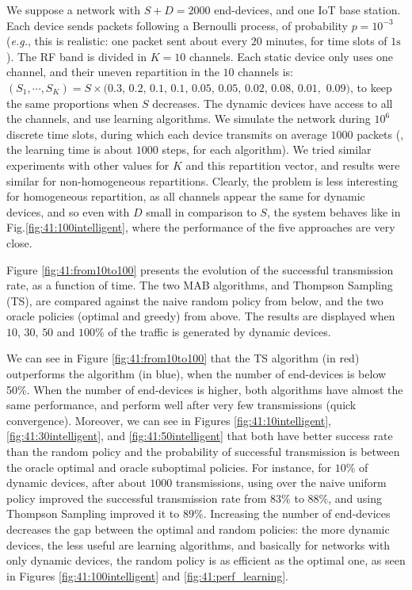 We suppose a network with $S + D = 2000$ end-devices, and one IoT base station.
Each device sends packets following a Bernoulli process, of probability $p = 10^{-3}$ (\emph{e.g.}, this is realistic: one packet sent about every $20$ minutes, for time slots of $1\mathrm{s}$).
The RF band is divided in $K = 10$ channels.
Each static device only uses one channel, and their uneven repartition in the $10$ channels is: $(S_1,\cdots, S_{K}) = S\times(0.3, \, 0.2, \, 0.1, \, 0.1, \, 0.05, \, 0.05, \, 0.02, \, 0.08, \, 0.01,$ $0.09)$, to keep the same proportions when $S$ decreases. The dynamic devices have access to all the channels, and use learning algorithms.
%
We simulate the network during $10^6$ discrete time slots, during which each device transmits on average $1000$ packets (\ie, the learning time is about $1000$ steps, for each algorithm).
We tried similar experiments with other values for $K$ and this repartition vector, and results were similar for non-homogeneous repartitions. Clearly, the problem is less interesting for homogeneous repartition, as all channels appear the same for dynamic devices, and so even with $D$ small in comparison to $S$, the system behaves like in Fig.\ref{fig:41:100intelligent}, where the performance of the five approaches are very close.

Figure \ref{fig:41:from10to100} presents the evolution of the successful transmission rate, as a function of time. %
The two MAB algorithms, \UCB{} and Thompson Sampling (TS), are compared against the naive random policy from below, and the two oracle policies (optimal and greedy) from above.
The results are displayed when $10$, $30$, $50$ and $100\%$ of the traffic is generated by dynamic devices.

We can see in Figure \ref{fig:41:from10to100} that the TS algorithm (in red) outperforms the \UCB{} algorithm (in blue), when the number of end-devices is below 50\%. When the number of end-devices is higher, both algorithms have almost the same performance, and perform well after very few transmissions (quick convergence).
Moreover, we can see in Figures \ref{fig:41:10intelligent}, \ref{fig:41:30intelligent}, and \ref{fig:41:50intelligent} that both have better success rate than the random policy and the probability of successful transmission is between the oracle optimal and oracle suboptimal policies.
For instance, for $10\%$ of dynamic devices, after about $1000$ transmissions, using \UCB{} over the naive uniform policy improved the successful transmission rate from $83\%$ to $88\%$, and using Thompson Sampling improved it to $89\%$.
Increasing the number of end-devices decreases the gap between the optimal and random policies: the more dynamic devices, the less useful are learning algorithms, and basically for networks with only dynamic devices, the random policy is as efficient as the optimal one, as seen in Figures \ref{fig:41:100intelligent} and \ref{fig:41:perf_learning}.


